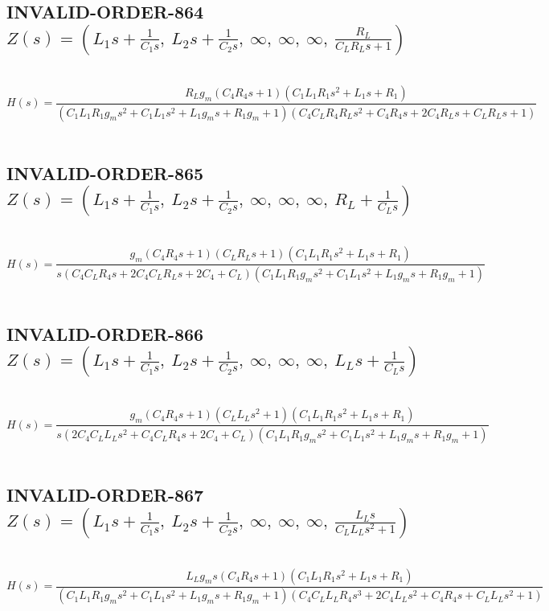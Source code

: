 \documentclass{article}
\begin{document}
\subsection{INVALID-ORDER-864 $Z(s) = \left( L_{1} s + \frac{1}{C_{1} s}, \  L_{2} s + \frac{1}{C_{2} s}, \  \infty, \  \infty, \  \infty, \  \frac{R_{L}}{C_{L} R_{L} s + 1}\right)$ } \ 
\textbf{\[H(s) = \frac{R_{L} g_{m} \left(C_{4} R_{4} s + 1\right) \left(C_{1} L_{1} R_{1} s^{2} + L_{1} s + R_{1}\right)}{\left(C_{1} L_{1} R_{1} g_{m} s^{2} + C_{1} L_{1} s^{2} + L_{1} g_{m} s + R_{1} g_{m} + 1\right) \left(C_{4} C_{L} R_{4} R_{L} s^{2} + C_{4} R_{4} s + 2 C_{4} R_{L} s + C_{L} R_{L} s + 1\right)}\] } \ 
\subsection{INVALID-ORDER-865 $Z(s) = \left( L_{1} s + \frac{1}{C_{1} s}, \  L_{2} s + \frac{1}{C_{2} s}, \  \infty, \  \infty, \  \infty, \  R_{L} + \frac{1}{C_{L} s}\right)$ } \ 
\textbf{\[H(s) = \frac{g_{m} \left(C_{4} R_{4} s + 1\right) \left(C_{L} R_{L} s + 1\right) \left(C_{1} L_{1} R_{1} s^{2} + L_{1} s + R_{1}\right)}{s \left(C_{4} C_{L} R_{4} s + 2 C_{4} C_{L} R_{L} s + 2 C_{4} + C_{L}\right) \left(C_{1} L_{1} R_{1} g_{m} s^{2} + C_{1} L_{1} s^{2} + L_{1} g_{m} s + R_{1} g_{m} + 1\right)}\] } \ 
\subsection{INVALID-ORDER-866 $Z(s) = \left( L_{1} s + \frac{1}{C_{1} s}, \  L_{2} s + \frac{1}{C_{2} s}, \  \infty, \  \infty, \  \infty, \  L_{L} s + \frac{1}{C_{L} s}\right)$ } \ 
\textbf{\[H(s) = \frac{g_{m} \left(C_{4} R_{4} s + 1\right) \left(C_{L} L_{L} s^{2} + 1\right) \left(C_{1} L_{1} R_{1} s^{2} + L_{1} s + R_{1}\right)}{s \left(2 C_{4} C_{L} L_{L} s^{2} + C_{4} C_{L} R_{4} s + 2 C_{4} + C_{L}\right) \left(C_{1} L_{1} R_{1} g_{m} s^{2} + C_{1} L_{1} s^{2} + L_{1} g_{m} s + R_{1} g_{m} + 1\right)}\] } \ 
\subsection{INVALID-ORDER-867 $Z(s) = \left( L_{1} s + \frac{1}{C_{1} s}, \  L_{2} s + \frac{1}{C_{2} s}, \  \infty, \  \infty, \  \infty, \  \frac{L_{L} s}{C_{L} L_{L} s^{2} + 1}\right)$ } \ 
\textbf{\[H(s) = \frac{L_{L} g_{m} s \left(C_{4} R_{4} s + 1\right) \left(C_{1} L_{1} R_{1} s^{2} + L_{1} s + R_{1}\right)}{\left(C_{1} L_{1} R_{1} g_{m} s^{2} + C_{1} L_{1} s^{2} + L_{1} g_{m} s + R_{1} g_{m} + 1\right) \left(C_{4} C_{L} L_{L} R_{4} s^{3} + 2 C_{4} L_{L} s^{2} + C_{4} R_{4} s + C_{L} L_{L} s^{2} + 1\right)}\] } \ 
\end{document}

